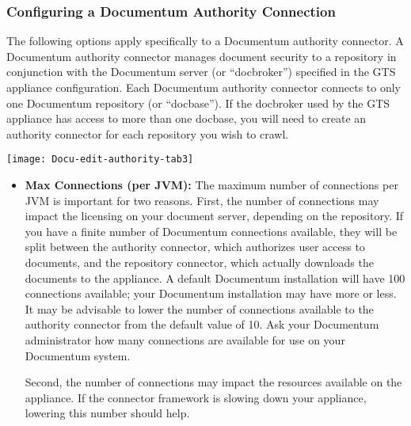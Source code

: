 %
%

\subsubsection{Configuring a Documentum Authority Connection}

The following options apply specifically to a Documentum authority
connector.  A Documentum authority connector manages document security
to a repository in conjunction with the Documentum server (or
``docbroker'') specified in the GTS appliance configuration.  Each
Documentum authority connector connects to only one Documentum
repository (or ``docbase''). If the docbroker used by the GTS
appliance has access to more than one docbase, you will need to create
an authority connector for each repository you wish to crawl.

\texttt{[image: Docu-edit-authority-tab3]}

\begin{itemize}

\item \textbf{Max Connections (per JVM):} The maximum number of
connections per JVM is important for two reasons.
\ifCombinedConnectorGuide \label{max-auth}\fi First, the number of
connections may impact the licensing on your document server,
depending on the repository. If you have a finite number of Documentum
connections available, they will be split between the authority
connector, which authorizes user access to documents, and the
repository connector, which actually downloads the documents to the
appliance. A default Documentum installation will have 100 connections
available; your Documentum installation may have more or less. It may
be advisable to lower the number of connections available to the
authority connector from the default value of 10. Ask your Documentum
administrator how many connections are available for use on your
Documentum system.

Second, the number of connections may impact the resources available
on the appliance. If the connector framework is slowing down your
appliance, lowering this number should help.

\end{itemize}

